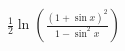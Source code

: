 \documentclass[preview]{standalone}
\begin{document}
\begin{align*}
\frac{1}{2} \ln \left( \frac{(1 + \sin{x})^2}{1 - \sin^2{x}} \right)
\end{align*}
\end{document}
